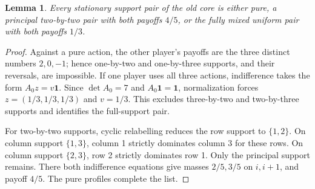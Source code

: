 \documentclass[11pt,a4paper]{article}
\numberwithin{equation}{section}
\newtheorem{lemma}[theorem]{Lemma}
\theoremstyle{definition}
\begin{document}
\begin{lemma}\label{lem:core}
Every stationary support pair of the old core is either pure, a
principal two-by-two pair with both payoffs \(4/5\), or the fully
mixed uniform pair with both payoffs \(1/3\).
\end{lemma}
\begin{proof}
Against a pure action, the other player's payoffs are the three
distinct numbers \(2,0,-1\); hence one-by-two and one-by-three
supports, and their reversals, are impossible. If one player uses all
three actions, indifference takes the form \(A_0z=v\mathbf1\).
Since \(\det A_0=7\) and \(A_0\mathbf1=\mathbf1\), normalization
forces \(z=(1/3,1/3,1/3)\) and \(v=1/3\). This excludes three-by-two
and two-by-three supports and identifies the full-support pair.

For two-by-two supports, cyclic relabelling reduces the row support
to \(\{1,2\}\). On column support \(\{1,3\}\), column 1 strictly
dominates column 3 for these rows. On column support \(\{2,3\}\),
row 2 strictly dominates row 1. Only the principal support remains.
There both indifference equations give masses \(2/5,3/5\) on
\(i,i+1\), and payoff \(4/5\). The pure profiles complete the list.
\end{proof}
\end{document}
